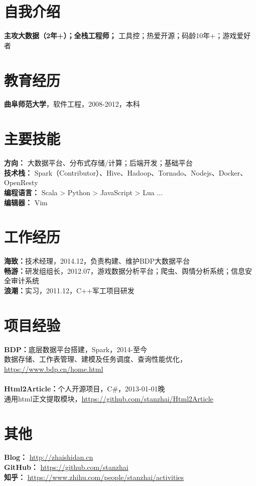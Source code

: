 \documentclass[UTF8,margin,line]{res}
\begin{document}

\begin{resume}

\section{\sc 自我介绍}
\textbf{主攻大数据（2年+）；全栈工程师；} 工具控；热爱开源；码龄10年+；游戏爱好者

\section{\sc 教育经历}
\textbf{曲阜师范大学}，软件工程，2008-2012，本科

\section{\sc 主要技能}
\textbf{方向：} 大数据平台、分布式存储/计算；后端开发；基础平台 \\
\textbf{技术栈：} Spark（Contributor）、Hive、Hadoop、Tornado、Nodejs、Docker、OpenResty \\
\textbf{编程语言：} Scala > Python > JavaScript > Lua ... \\
\textbf{编辑器：} Vim

\section{\sc 工作经历}
\textbf{海致：}技术经理，2014.12，负责构建、维护BDP大数据平台 \\
\textbf{畅游：}研发组组长，2012.07，游戏数据分析平台；爬虫、舆情分析系统；信息安全审计系统 \\
\textbf{浪潮：}实习，2011.12，C++军工项目研发

\section{\sc 项目经验}
\textbf{BDP：}底层数据平台搭建，Spark，2014-至今 \\
数据存储、工作表管理、建模及任务调度、查询性能优化， \url{https://www.bdp.cn/home.html} \\
\\
\textbf{Html2Article：}个人开源项目，C\#，2013-01-01晚 \\
通用html正文提取模块，\url{https://github.com/stanzhai/Html2Article} \\

\section{\sc 其他}
\textbf{Blog：} \url{http://zhaishidan.cn} \\
\textbf{GitHub：} \url{https://github.com/stanzhai} \\
\textbf{知乎：} \url{https://www.zhihu.com/people/stanzhai/activities} \\

\end{resume}
\end{document}
